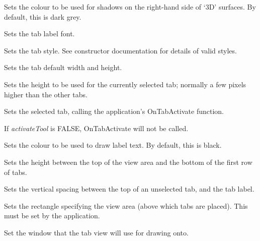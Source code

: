 Sets the colour to be used for shadows on the right-hand side of `3D' surfaces. By default, this is dark grey.



Sets the tab label font.



Sets the tab style. See constructor documentation for details of valid styles.



Sets the tab default width and height.



Sets the height to be used for the currently selected tab; normally a few pixels
higher than the other tabs.



Sets the selected tab, calling the application's OnTabActivate function.

If {\it activateTool} is FALSE, OnTabActivate will not be called.



Sets the colour to be used to draw label text. By default, this is
black.



Sets the height between the top of the view area and the bottom of the first
row of tabs.



Sets the vertical spacing between the top of an unselected tab, and the tab label.

\label{wxtabviewsetviewrect}


Sets the rectangle specifying the view area (above which tabs are
placed). This must be set by the application. 



Set the window that the tab view will use for drawing onto.

